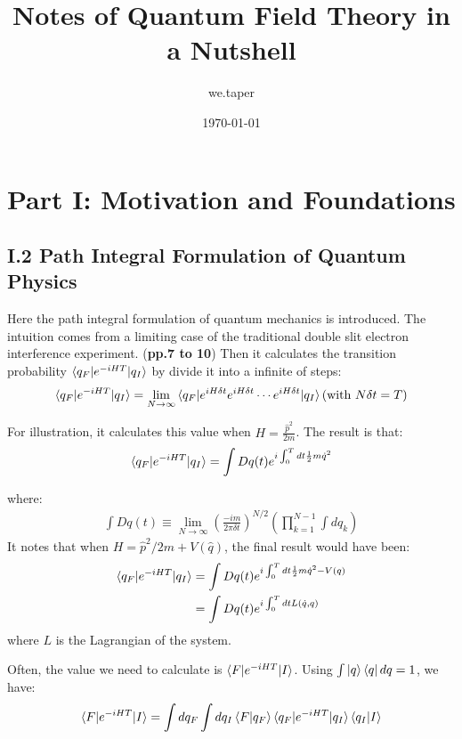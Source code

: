 \documentclass{book}
\title{Notes of Quantum Field Theory in a Nutshell}
\date{\today}
\author{we.taper}
\numberwithin{equation}{subsection} %
\theoremstyle{definition}
\begin{document}
	\maketitle
	\tableofcontents

\chapter{Part I: Motivation and Foundations}
\label{sec:QFT_in_a_Nutshell.Part_I}
\section{I.2 Path Integral Formulation of Quantum Physics}
\label{sec:QFT_in_a_Nutshell_Part_I.2}
Here the path integral formulation of quantum mechanics is introduced.
The intuition comes from a limiting case of the traditional double 
slit electron interference experiment. (\textbf{pp.7 to 10}) Then 
it calculates the transition probability $\braket{q_F|e^{-iHT}|q_I}$
by divide it into a infinite of steps:
\begin{align}
    \braket{q_F|e^{-iHT}|q_I} = \lim_{N\to \infty}
    \braket{q_F|e^{iH\delta t}e^{iH\delta t}\cdots e^{iH\delta t}|q_I}
    (\text{with }N\delta t = T)
\end{align}

For illustration, it calculates this value when 
$H=\frac{\hat{p}^2}{2m}$. The result is that:
\begin{align*}
    \braket{q_F|e^{-iHT}|q_I} = \int Dq(t) 
        e^{i\int_0^T dt \frac{1}{2}m \dot{q}^2 }
\end{align*}

where:
\begin{align}
    \int Dq(t) \equiv \lim_{N\to \infty} 
    \left( \frac{-im}{2\pi \delta t}\right)^{N/2}
    \left( \prod_{k=1}^{N-1} \int dq_k \right)
\end{align}
It notes that when $H=\hat{p}^2/2m + V(\hat{q})$, the final result
would have been:
\begin{align}
    \label{eq:QFT_in_a_Nutshell_Part_I.2.TransProbability}
    \braket{q_F|e^{-iHT}|q_I} &= \int Dq(t) 
        e^{i\int_0^T dt \frac{1}{2}m \dot{q}^2 - V(q)}
        \nonumber \\
        &=\int Dq(t) e^{i \int_0^T dt L(\dot{q}, q)}
\end{align}
where $L$ is the Lagrangian of the system.

Often, the value we need to calculate is $\braket{F|e^{-iHT}|I}$.
Using $\int \ket{q}\bra{q} dq=1$, we have:
\begin{align}
    \braket{F|e^{-iHT}|I} = \int dq_F \int dq_I
        \braket{F|q_F} \braket{q_F|e^{-iHT}|q_I}\braket{q_I|I}
\end{align}
\end{document}
